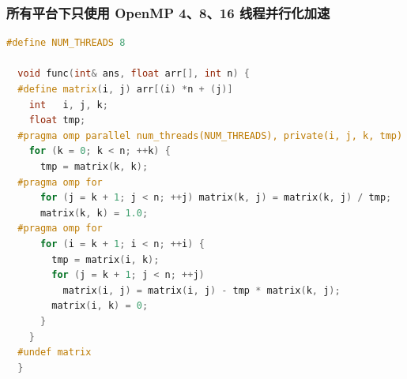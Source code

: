 \documentclass[a4paper]{article}
\begin{document}
\begin{table}[]
  \centering
  \caption{所有平台平凡算法结果对比}
  \label{tab:ord}
\end{table}

\subsubsection{所有平台下只使用 OpenMP 4、8、16 线程并行化加速}

\begin{lstlisting}[title=OpenMP 并行化加速,frame=trbl,language={C++}]
  #define NUM_THREADS 8

  void func(int& ans, float arr[], int n) {
  #define matrix(i, j) arr[(i) *n + (j)]
    int   i, j, k;
    float tmp;
  #pragma omp parallel num_threads(NUM_THREADS), private(i, j, k, tmp)
    for (k = 0; k < n; ++k) {
      tmp = matrix(k, k);
  #pragma omp for
      for (j = k + 1; j < n; ++j) matrix(k, j) = matrix(k, j) / tmp;
      matrix(k, k) = 1.0;
  #pragma omp for
      for (i = k + 1; i < n; ++i) {
        tmp = matrix(i, k);
        for (j = k + 1; j < n; ++j)
          matrix(i, j) = matrix(i, j) - tmp * matrix(k, j);
        matrix(i, k) = 0;
      }
    }
  #undef matrix
  }
\end{lstlisting}
\end{document}
